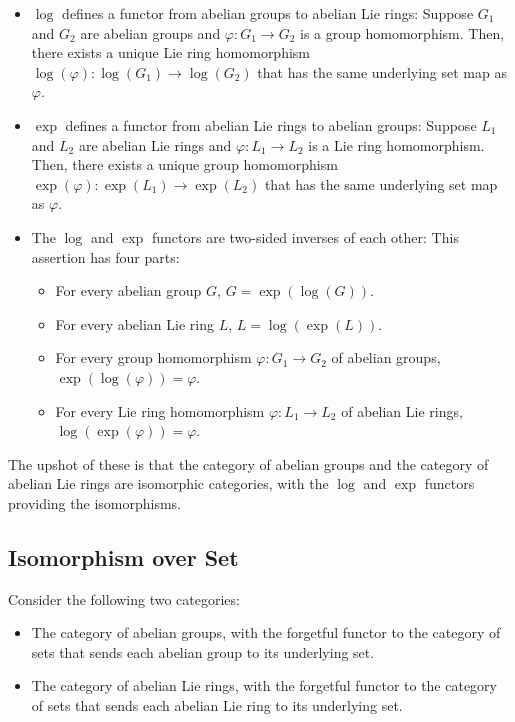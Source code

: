 \documentclass{ucetd}
\begin{document}
\begin{itemize}
\item $\log$ defines a functor from abelian groups to abelian Lie
  rings: Suppose $G_1$ and $G_2$ are abelian groups and $\varphi:G_1
  \to G_2$ is a group homomorphism. Then, there exists a unique Lie
  ring homomorphism $\log(\varphi): \log(G_1) \to \log(G_2)$ that has
  the same underlying set map as $\varphi$.
\item $\exp$ defines a functor from abelian Lie rings to abelian
  groups: Suppose $L_1$ and $L_2$ are abelian Lie rings and $\varphi:L_1
  \to L_2$ is a Lie ring homomorphism. Then, there exists a unique
  group homomorphism $\exp(\varphi): \exp(L_1) \to \exp(L_2)$ that has
  the same underlying set map as $\varphi$.
\item The $\log$ and $\exp$ functors are two-sided inverses of each
  other: This assertion has four parts:
  \begin{itemize}
    \item For every abelian group $G$, $G = \exp(\log(G))$. 
    \item For every abelian Lie ring $L$, $L = \log(\exp(L))$.
    \item For every group homomorphism $\varphi:G_1 \to G_2$ of
      abelian groups, $\exp(\log(\varphi)) = \varphi$.
    \item For every Lie ring homomorphism $\varphi:L_1 \to L_2$ of
      abelian Lie rings, $\log(\exp(\varphi)) = \varphi$.
  \end{itemize}
\end{itemize}

The upshot of these is that the category of abelian groups and the
category of abelian Lie rings are isomorphic categories, with the
$\log$ and $\exp$ functors providing the isomorphisms.
\subsection{Isomorphism over Set}

Consider the following two categories:

\begin{itemize}
\item The category of abelian groups, with the forgetful functor to
  the category of sets that sends each abelian group to its underlying
  set.
\item The category of abelian Lie rings, with the forgetful functor to
  the category of sets that sends each abelian Lie ring to its
  underlying set.
\end{itemize}
\end{document}
